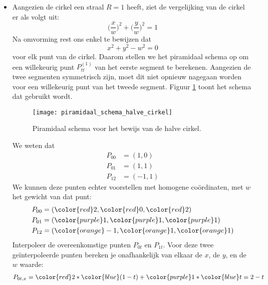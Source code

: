\begin{enumerate}
			
	{
		\begin{itemize} 
			\item Aangezien de cirkel een straal $R=1$ heeft, ziet de vergelijking van de cirkel er als volgt uit:
			$$\bigg(\frac{x}{w}\bigg)^2 + \bigg(\frac{y}{w}\bigg)^2 = 1$$
			Na omvorming rest ons enkel te bewijzen dat
			$$x^2 + y^2 - w^2 = 0$$ voor elk punt van de cirkel. Daarom stellen we het piramidaal schema op om een willekeurig punt $P_{tt}^{(1)}$ van het eerste segment te berekenen. Aangezien de twee segmenten symmetrisch zijn, moet dit niet opnieuw nagegaan worden voor een willekeurig punt van het tweede segment. Figuur \ref{fig:piramidaal_schema_halve_cirkel} toont het schema dat gebruikt wordt.
			\begin{figure}[ht]
				\centering
				\texttt{[image: piramidaal\_schema\_halve\_cirkel]}
				\caption{Piramidaal schema voor het bewijs van de halve cirkel.}
				\label{fig:piramidaal_schema_halve_cirkel}
			\end{figure}
			 We weten dat 
			\begin{equation*}
				\begin{split}
					P_{00} & = (1, 0) \\
					P_{01} & = (1, 1) \\
					P_{12} & = (-1, 1)
				\end{split}
			\end{equation*}
			We kunnen deze punten echter voorstellen met homogene coördinaten, met $w$ het gewicht van dat punt:
			\begin{equation*}
				\begin{split}
					P_{00} & = ({\color{red}2}, {\color{red}0}, {\color{red}2}) \\
					P_{01} & = ({\color{purple}1}, {\color{purple}1}, {\color{purple}1}) \\
					P_{12} & = ({\color{orange}-1}, {\color{orange}1}, {\color{orange}1}) \\
				\end{split}
			\end{equation*}
			Interpoleer de overeenkomstige punten $P_{0t}$ en $P_{1t}$. Voor deze twee geïnterpoleerde punten bereken je onafhankelijk van elkaar de $x$, de $y$, en de $w$ waarde:
			\begin{equation*}
				\begin{split}
					P_{0t, x} & = {\color{red}2} * {\color{blue}(1 - t)} + {\color{purple}1} * {\color{blue}t} = 2 - t \\

\end{split}
\end{equation*}
\end{itemize}}
\end{enumerate}
